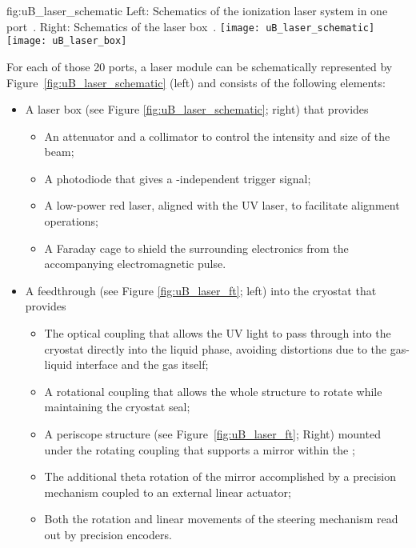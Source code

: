 \begin{dunefigure}{fig:uB_laser_schematic}
{Left: Schematics of the ionization laser system in one port~\cite{Antonello:2015lea}. Right: Schematics of the laser box~\cite{microboone}.}
\texttt{[image: uB\_laser\_schematic]}
\texttt{[image: uB\_laser\_box]}
\end{dunefigure}



For each of those \num{20} ports, a laser module can be schematically represented by Figure~\ref{fig:uB_laser_schematic} (left) and consists of the following elements:
\begin{itemize}
    \item A laser box (see Figure \ref{fig:uB_laser_schematic}; right) that provides
    \begin{itemize}
        \item An attenuator and a collimator to control the intensity and size of the beam;
        \item A photodiode that gives a -independent trigger signal;
        \item A low-power red laser, aligned with the UV laser, to facilitate alignment operations;
        \item A Faraday cage to shield the surrounding electronics from the accompanying electromagnetic pulse. %
    \end{itemize}
    \item A feedthrough (see Figure \ref{fig:uB_laser_ft}; left) into the cryostat that provides
    \begin{itemize}
        \item The optical coupling that allows the UV light to pass through into the cryostat directly into the liquid phase, avoiding distortions due to the gas-liquid interface and the gas itself;
        \item A rotational coupling that allows the whole structure to rotate while maintaining the cryostat seal;
        \item A periscope structure (see Figure~\ref{fig:uB_laser_ft}; Right) mounted under the rotating coupling that supports a mirror within the ;
        \item The additional theta rotation of the mirror accomplished by a precision mechanism coupled to an external linear actuator;
        \item Both the rotation and linear movements of the steering mechanism read out by precision encoders.
    \end{itemize}
    
\end{itemize}


